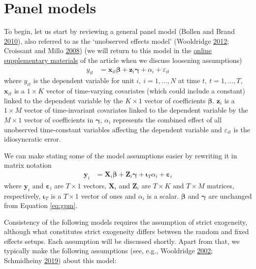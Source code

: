 \documentclass[
  12pt,
  a4paper]{article}
\begin{document}
\hypertarget{panel}{%
\section{Panel models}\label{panel}}

To begin, let us start by reviewing a general panel model (Bollen and
Brand \protect\hyperlink{ref-Bollen2010}{2010}), also referred to as the
`unobserved effects model' (Wooldridge
\protect\hyperlink{ref-Wooldridge2012}{2012}; Croissant and Millo
\protect\hyperlink{ref-R-plm_a}{2008}) (we will return to this model in
the
\href{https://github.com/henrik-andersen/FE-SEM/blob/master/extensions.pdf}{online
supplementary materials} of the article when we discuss loosening
assumptions) \begin{align}
y_{it} & = \bm{x}_{it}\bm{\beta} + \bm{z}_{i}\bm{\gamma} + \alpha_{i} + \varepsilon_{it} \label{eq:gpm}
\end{align} where \(y_{it}\) is the dependent variable for unit
\(i, \ i = 1, ..., N\) at time \(t, \ t = 1, ..., T\), \(\bm{x}_{it}\)
is a \(1 \times K\) vector of time-varying covariates (which could
include a constant) linked to the dependent variable by the
\(K \times 1\) vector of coefficients \(\bm{\beta}\). \(\bm{z}_{i}\) is
a \(1 \times M\) vector of time-invariant covariates linked to the
dependent variable by the \(M \times 1\) vector of coefficients in
\(\bm{\gamma}\), \(\alpha_{i}\) represents the combined effect of all
unobserved time-constant variables affecting the dependent variable and
\(\varepsilon_{it}\) is the idiosyncratic error.

We can make stating some of the model assumptions easier by rewriting it
in matrix notation \begin{align}
\bm{y}_{i} & = \bm{X}_{i}\bm{\beta} + \bm{Z}_{i}\bm{\gamma} + \bm{\iota}_{T}\alpha_{i} + \bm{\varepsilon}_{i}
\end{align} where \(\bm{y}_{i}\) and \(\bm{\varepsilon}_{i}\) are
\(T \times 1\) vectors, \(\bm{X}_{i}\) and \(\bm{Z}_{i}\) are
\(T \times K\) and \(T \times M\) matrices, respectively,
\(\bm{\iota}_{T}\) is a \(T \times 1\) vector of ones and \(\alpha_{i}\)
is a scalar. \(\bm{\beta}\) and \(\bm{\gamma}\) are unchanged from
Equation \eqref{eq:gpm}.

Consistency of the following models requires the assumption of strict
exogeneity, although what constitutes strict exogeneity differs between
the random and fixed effects setups. Each assumption will be discussed
shortly. Apart from that, we typically make the following assumptions
(see, e.g., Wooldridge \protect\hyperlink{ref-Wooldridge2002}{2002};
Schmidheiny \protect\hyperlink{ref-Schmidheiny2019}{2019}) about this
model:
\end{document}
